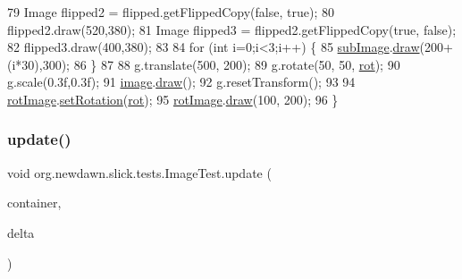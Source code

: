 \begin{DoxyCode}
79         Image flipped2 = flipped.getFlippedCopy(\textcolor{keyword}{false}, \textcolor{keyword}{true});
80         flipped2.draw(520,380);
81         Image flipped3 = flipped2.getFlippedCopy(\textcolor{keyword}{true}, \textcolor{keyword}{false});
82         flipped3.draw(400,380);
83         
84         \textcolor{keywordflow}{for} (\textcolor{keywordtype}{int} i=0;i<3;i++) \{
85             \mbox{\hyperlink{classorg_1_1newdawn_1_1slick_1_1tests_1_1_image_test_a2900b4ce582e499edf146c02f56c24b2}{subImage}}.\mbox{\hyperlink{classorg_1_1newdawn_1_1slick_1_1_image_a9bddcca05c7140ab45df8ac5b250b6cd}{draw}}(200+(i*30),300);
86         \}
87         
88         g.translate(500, 200);
89         g.rotate(50, 50, \mbox{\hyperlink{classorg_1_1newdawn_1_1slick_1_1tests_1_1_image_test_a6fbbcc82d7dea5cda7b3a5bbe47c1cf0}{rot}});
90         g.scale(0.3f,0.3f);
91         \mbox{\hyperlink{classorg_1_1newdawn_1_1slick_1_1tests_1_1_image_test_a6a3eac1a7e5d2b84a03f6bc68bb042de}{image}}.\mbox{\hyperlink{classorg_1_1newdawn_1_1slick_1_1_image_a9bddcca05c7140ab45df8ac5b250b6cd}{draw}}();
92         g.resetTransform();
93         
94         \mbox{\hyperlink{classorg_1_1newdawn_1_1slick_1_1tests_1_1_image_test_abd3da665257fd4917d04aab4373e001e}{rotImage}}.\mbox{\hyperlink{classorg_1_1newdawn_1_1slick_1_1_image_a6c4607d7ab6869b78ef6b81762b6698e}{setRotation}}(\mbox{\hyperlink{classorg_1_1newdawn_1_1slick_1_1tests_1_1_image_test_a6fbbcc82d7dea5cda7b3a5bbe47c1cf0}{rot}});
95         \mbox{\hyperlink{classorg_1_1newdawn_1_1slick_1_1tests_1_1_image_test_abd3da665257fd4917d04aab4373e001e}{rotImage}}.\mbox{\hyperlink{classorg_1_1newdawn_1_1slick_1_1_image_a9bddcca05c7140ab45df8ac5b250b6cd}{draw}}(100, 200);
96     \}
\end{DoxyCode}
\mbox{\label{classorg_1_1newdawn_1_1slick_1_1tests_1_1_image_test_a40c8ee6897cc066d46e92ce5a63eeea0}} 
\subsubsection{\texorpdfstring{update()}{update()}}
{\footnotesize\ttfamily void org.\+newdawn.\+slick.\+tests.\+Image\+Test.\+update (\begin{DoxyParamCaption}\item[{\mbox{\hyperlink{classorg_1_1newdawn_1_1slick_1_1_game_container}{Game\+Container}}}]{container,  }\item[{int}]{delta }\end{DoxyParamCaption})\hspace{0.3cm}{\ttfamily [inline]}}

